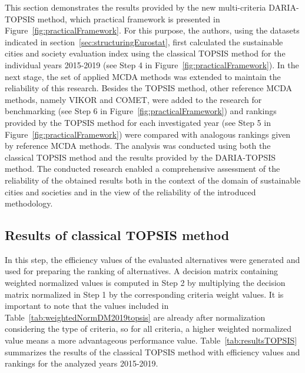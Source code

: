 \documentclass[final,5p,times,twocolumn,authoryear]{elsarticle}
\begin{document}
This section demonstrates the results provided by the new multi-criteria DARIA-TOPSIS method, which practical framework is presented in Figure~\ref{fig:practicalFramework}. For this purpose, the authors, using the datasets indicated in section~\ref{sec:structuringEurostat}, first calculated the sustainable cities and society evaluation index using the classical TOPSIS method for the individual years 2015-2019 (see Step 4 in Figure~\ref{fig:practicalFramework}). In the next stage, the set of applied MCDA methods was extended to maintain the reliability of this research. Besides the TOPSIS method, other reference MCDA methods, namely VIKOR and COMET, were added to the research for benchmarking (see Step 6 in Figure~\ref{fig:practicalFramework}) and rankings provided by the TOPSIS method for each investigated year (see Step 5 in Figure~\ref{fig:practicalFramework}) were compared with analogous rankings given by reference MCDA methods. The analysis was conducted using both the classical TOPSIS method and the results provided by the DARIA-TOPSIS method. The conducted research enabled a comprehensive assessment of the reliability of the obtained results both in the context of the domain of sustainable cities and societies and in the view of the reliability of the introduced methodology.

\subsection{Results of classical TOPSIS method}
\label{sec:resultsClassicalTOPSIS}

In this step, the efficiency values of the evaluated alternatives were generated and used for preparing the ranking of alternatives. A decision matrix containing weighted normalized values is computed in Step 2 by multiplying the decision matrix normalized in Step 1 by the corresponding criteria weight values. It is important to note that the values included in Table~\ref{tab:weightedNormDM2019topsis} are already after normalization considering the type of criteria, so for all criteria, a higher weighted normalized value means a more advantageous performance value. Table~\ref{tab:resultsTOPSIS} summarizes the results of the classical TOPSIS method with efficiency values and rankings for the analyzed years 2015-2019.
\end{document}
